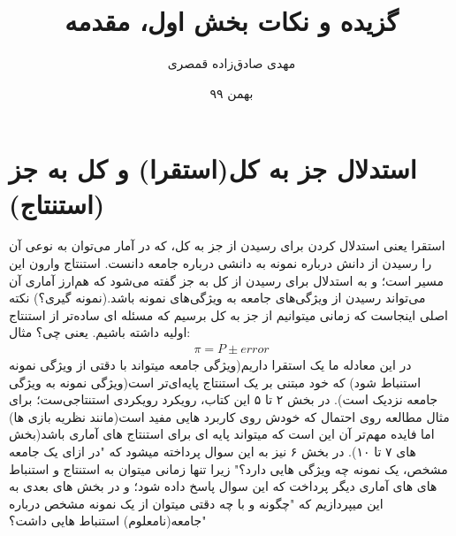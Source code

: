 \documentclass[12pt,onecolumn,a4paper]{article}
\begin{document}
\title{گزیده و نکات بخش اول، مقدمه\\} 
\author{مهدی صادق‌زاده قمصری}
\date{بهمن ۹۹}
\maketitle

\section{استدلال جز به کل(استقرا) و کل به جز (استنتاج)} 
استقرا یعنی استدلال کردن برای رسیدن از جز به کل، که در آمار می‌توان به نوعی آن را رسیدن از دانش درباره نمونه به دانشی درباره جامعه دانست.
استنتاج وارون این مسیر است؛ و به استدلال برای رسیدن از کل به جز گفته می‌شود که هم‌ارز آماری آن می‌تواند رسیدن از ویژگی‌های جامعه به ویژگی‌های نمونه باشد.(نمونه گیری؟)
نکته اصلی اینجاست که زمانی میتوانیم از جز به کل برسیم که مسئله ای ساده‌تر از استنتاج اولیه داشته باشیم. یعنی چی؟ مثال:
\begin{align*}
\pi = P \pm error     
\end{align*}
در این معادله ما یک استقرا داریم(ویژگی جامعه میتواند با دقتی از ویژگی نمونه استنباط شود) که خود مبتنی بر یک استنتاج پایه‌ای‌تر است(ویژگی نمونه به ویژگی جامعه نزدیک است). 
در بخش ۲ تا ۵ این کتاب، رویکرد رویکردی استنتاجی‌ست؛ برای مثال مطالعه روی احتمال که خودش روی کاربرد هایی مفید است(مانند نظریه بازی ها) اما فایده مهم‌تر آن این است که میتواند پایه ای برای استنتاج های آماری باشد(بخش های ۷ تا ۱۰). 
در بخش ۶ نیز به این سوال پرداخته میشود که "در ازای یک جامعه مشخص، یک نمونه چه ویژگی هایی دارد؟"
زیرا تنها زمانی میتوان به استنتاج و استنباط های های آماری دیگر پرداخت که این سوال پاسخ داده شود؛ و در بخش های بعدی به این میپردازیم که "چگونه و با چه دقتی میتوان از یک نمونه مشخص درباره جامعه(نامعلوم) استنباط هایی داشت؟" 
\end{document}
